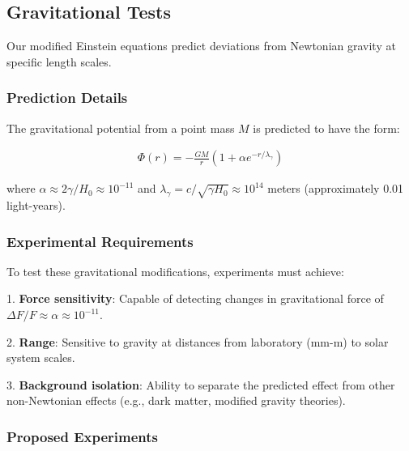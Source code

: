 \documentclass[11pt,english,twoside]{article}
\begin{document}
\subsection{Gravitational Tests}

Our modified Einstein equations predict deviations from Newtonian gravity at specific length scales.

\subsubsection{Prediction Details}

The gravitational potential from a point mass $M$ is predicted to have the form:

\begin{align}
\Phi(r) = -\frac{GM}{r}\left(1 + \alpha e^{-r/\lambda_\gamma}\right)
\end{align}

where $\alpha \approx 2\gamma/H_0 \approx 10^{-11}$ and $\lambda_\gamma = c/\sqrt{\gamma H_0} \approx 10^{14}$ meters (approximately 0.01 light-years).

\subsubsection{Experimental Requirements}

To test these gravitational modifications, experiments must achieve:

1. \textbf{Force sensitivity}: Capable of detecting changes in gravitational force of $\Delta F/F \approx \alpha \approx 10^{-11}$.

2. \textbf{Range}: Sensitive to gravity at distances from laboratory (mm-m) to solar system scales.

3. \textbf{Background isolation}: Ability to separate the predicted effect from other non-Newtonian effects (e.g., dark matter, modified gravity theories).

\subsubsection{Proposed Experiments}
\end{document}
